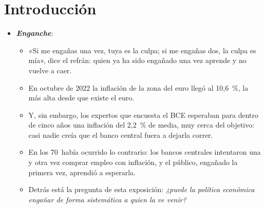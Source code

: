 \documentclass[11pt]{article}
\begin{document}
\tceetitulo

\section*{Introducción}

\begin{itemize}
\item \textbf{\emph{Enganche}}:
  \begin{itemize}
  \item «Si me engañas una vez, tuya es la culpa; si me engañas dos, la culpa es mía», dice el refrán: quien ya ha sido engañado una vez aprende y no vuelve a caer.
  \item En octubre de 2022 la inflación de la zona del euro llegó al 10,6~\%, la más alta desde que existe el euro\nocite{Eurostat2026IAPC}.
  \item Y, sin embargo, los expertos que encuesta el BCE esperaban para dentro de cinco años una inflación del 2,2~\% de media, muy cerca del objetivo\nocite{BCE2026SPF}: casi nadie creía que el banco central fuera a dejarla correr.
  \item En los 70~había ocurrido lo contrario: los bancos centrales intentaron una y otra vez comprar empleo con inflación, y el público, engañado la primera vez, aprendió a esperarla.
  \item Detrás está la pregunta de esta exposición: \emph{¿puede la política económica engañar de forma sistemática a quien la ve venir?}
  \end{itemize}


\end{itemize}
\end{document}
